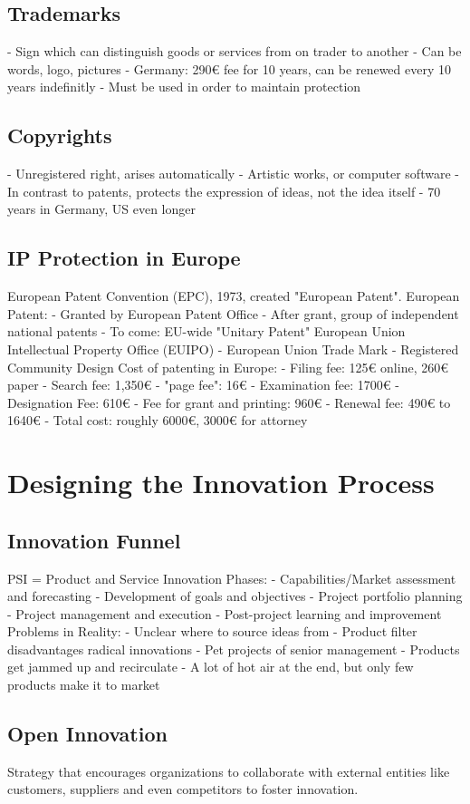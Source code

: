\documentclass{scrartcl}
\begin{document}
\subsection*{Trademarks}
- Sign which can distinguish goods or services from on trader to another
- Can be words, logo, pictures
- Germany: 290€ fee for 10 years, can be renewed every 10 years indefinitly
- Must be used in order to maintain protection
\subsection*{Copyrights}
- Unregistered right, arises automatically
- Artistic works, or computer software
- In contrast to patents, protects the expression of ideas, not the idea itself
- 70 years in Germany, US even longer
\subsection*{IP Protection in Europe}
European Patent Convention (EPC), 1973, created "European Patent".
European Patent:
- Granted by European Patent Office
- After grant, group of independent national patents
- To come: EU-wide "Unitary Patent"
European Union Intellectual Property Office (EUIPO)
- European Union Trade Mark
- Registered Community Design
Cost of patenting in Europe:
- Filing fee: 125€ online, 260€ paper
- Search fee: 1,350€
- "page fee": 16€
- Examination fee: 1700€
- Designation Fee: 610€
- Fee for grant and printing: 960€
- Renewal fee: 490€ to 1640€
- Total cost: roughly 6000€, 3000€ for attorney

\section*{Designing the Innovation Process}
\subsection*{Innovation Funnel}
PSI = Product and Service Innovation
Phases:
- Capabilities/Market assessment and forecasting
- Development of goals and objectives
- Project portfolio planning
- Project management and execution
- Post-project learning and improvement
Problems in Reality:
- Unclear where to source ideas from
- Product filter disadvantages radical innovations
- Pet projects of senior management
- Products get jammed up and recirculate
- A lot of hot air at the end, but only few products make it to market
\subsection*{Open Innovation}
Strategy that encourages organizations to collaborate with external entities like customers, suppliers and even competitors to foster innovation.
\end{document}
